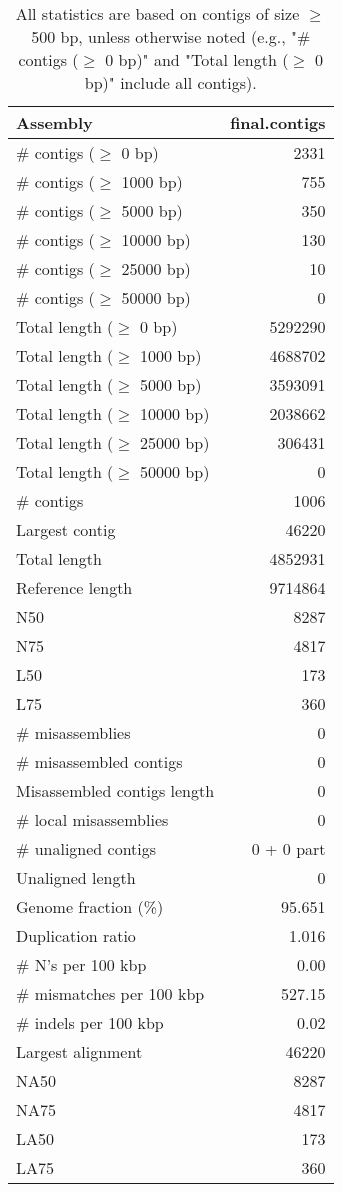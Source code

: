 \documentclass[12pt,a4paper]{article}
\begin{document}
\begin{table}[ht]
\begin{center}
\caption{All statistics are based on contigs of size $\geq$ 500 bp, unless otherwise noted (e.g., "\# contigs ($\geq$ 0 bp)" and "Total length ($\geq$ 0 bp)" include all contigs).}
\begin{tabular}{|l*{1}{|r}|}
\hline
Assembly & final.contigs \\ \hline
\# contigs ($\geq$ 0 bp) & 2331 \\ \hline
\# contigs ($\geq$ 1000 bp) & 755 \\ \hline
\# contigs ($\geq$ 5000 bp) & 350 \\ \hline
\# contigs ($\geq$ 10000 bp) & 130 \\ \hline
\# contigs ($\geq$ 25000 bp) & 10 \\ \hline
\# contigs ($\geq$ 50000 bp) & 0 \\ \hline
Total length ($\geq$ 0 bp) & 5292290 \\ \hline
Total length ($\geq$ 1000 bp) & 4688702 \\ \hline
Total length ($\geq$ 5000 bp) & 3593091 \\ \hline
Total length ($\geq$ 10000 bp) & 2038662 \\ \hline
Total length ($\geq$ 25000 bp) & 306431 \\ \hline
Total length ($\geq$ 50000 bp) & 0 \\ \hline
\# contigs & 1006 \\ \hline
Largest contig & 46220 \\ \hline
Total length & 4852931 \\ \hline
Reference length & 9714864 \\ \hline
N50 & 8287 \\ \hline
N75 & 4817 \\ \hline
L50 & 173 \\ \hline
L75 & 360 \\ \hline
\# misassemblies & 0 \\ \hline
\# misassembled contigs & 0 \\ \hline
Misassembled contigs length & 0 \\ \hline
\# local misassemblies & 0 \\ \hline
\# unaligned contigs & 0 + 0 part \\ \hline
Unaligned length & 0 \\ \hline
Genome fraction (\%) & 95.651 \\ \hline
Duplication ratio & 1.016 \\ \hline
\# N's per 100 kbp & 0.00 \\ \hline
\# mismatches per 100 kbp & 527.15 \\ \hline
\# indels per 100 kbp & 0.02 \\ \hline
Largest alignment & 46220 \\ \hline
NA50 & 8287 \\ \hline
NA75 & 4817 \\ \hline
LA50 & 173 \\ \hline
LA75 & 360 \\ \hline
\end{tabular}
\end{center}
\end{table}
\end{document}
